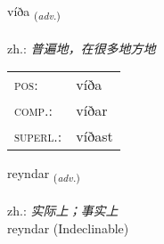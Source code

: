 \documentclass[frontgrid, backgrid]{flacards}\usepackage[]{graphicx}\usepackage[]{xcolor}
\begin{document}
\renewcommand{\blhead}{\vskip5pt {\small\bfseries\footnotesize Atviksorð | 副词 }}
\renewcommand{\bcfoot}{\vskip5pt \hspace{2pt}{\small\bfseries\footnotesize 1K}}


{víða \small{\textsubscript{(\textit{adv.})}} \\[1ex] %
\textphonetic{[viːða]} \\
zh.: \emph{普遍地，在很多地方地} \\  [2ex]
\renewcommand*{\arraystretch}{0.8}
\begin{tabular}{ll}
\textsc{pos}: & víða \\ 
\textsc{comp.}: & víðar \\ 
\textsc{superl.}: & víðast \\
\end{tabular}
}


\renewcommand{\flhead}{\vskip5pt \fboxsep=0pt {\small\bfseries\footnotesize Atviksorð | 副词}}
\renewcommand{\fcfoot}{\vskip5pt \fboxsep=0pt \hspace{2pt}{\small\bfseries\footnotesize 1K}}

\renewcommand{\blhead}{\vskip5pt {\small\bfseries\footnotesize Atviksorð | 副词 }}
\renewcommand{\bcfoot}{\vskip5pt \hspace{2pt}{\small\bfseries\footnotesize 1K}}


{reyndar \small{\textsubscript{(\textit{adv.})}} \\[1ex]
\textphonetic{[reintar]} \\
zh.: \emph{实际上；事实上} \\  [2ex]
reyndar (Indeclinable)}

\renewcommand{\flhead}{\vskip5pt \fboxsep=0pt {\small\bfseries\footnotesize Nafnorð | 名词}}
\renewcommand{\fcfoot}{\vskip5pt \fboxsep=0pt \hspace{2pt}{\small\bfseries\footnotesize 1K}}

\renewcommand{\blhead}{\vskip5pt {\small\bfseries\footnotesize Nafnorð | 名词 }}
\renewcommand{\bcfoot}{\vskip5pt \hspace{2pt}{\small\bfseries\footnotesize 1K}}
\end{document}
